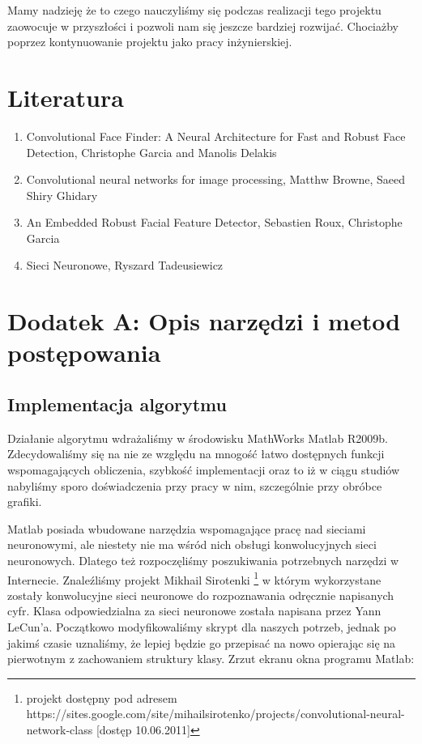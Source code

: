 \documentclass[11pt,a4paper]{article}
\begin{document}
Mamy nadzieję że to czego nauczyliśmy się podczas realizacji tego projektu zaowocuje w przyszłości 
i pozwoli nam się jeszcze bardziej rozwijać. Chociażby poprzez kontynuowanie projektu jako pracy inżynierskiej.

\section{Literatura}
 \begin{enumerate}
\item Convolutional Face Finder: A Neural Architecture for Fast and Robust Face Detection, 
Christophe Garcia and Manolis Delakis
\item Convolutional neural networks for image processing, Matthw Browne, Saeed Shiry Ghidary
\item An Embedded Robust Facial Feature Detector, Sebastien Roux, Christophe Garcia
\item Sieci Neuronowe, Ryszard Tadeusiewicz
 \end{enumerate}
\newpage
\section{Dodatek A: Opis narzędzi i metod postępowania}
\subsection{Implementacja algorytmu}
Działanie algorytmu wdrażaliśmy w środowisku MathWorks Matlab R2009b. Zdecydowaliśmy się na nie ze 
względu na mnogość łatwo dostępnych funkcji wspomagających obliczenia, szybkość implementacji oraz 
to iż w ciągu studiów nabyliśmy sporo doświadczenia przy pracy w nim, szczególnie przy obróbce 
grafiki.

Matlab posiada wbudowane narzędzia wspomagające pracę nad sieciami neuronowymi, ale niestety nie ma 
wśród nich obsługi konwolucyjnych sieci neuronowych. Dlatego też rozpoczęliśmy poszukiwania 
potrzebnych narzędzi w Internecie. Znaleźliśmy projekt Mikhail Sirotenki \footnote{ projekt dostępny
pod adresem  https://sites.google.com/site/mihailsirotenko/projects/convolutional-neural-network-class
[dostęp 10.06.2011]}  w którym wykorzystane zostały konwolucyjne sieci neuronowe do rozpoznawania 
odręcznie napisanych cyfr. Klasa odpowiedzialna za sieci neuronowe została napisana przez 
Yann LeCun'a. Początkowo modyfikowaliśmy skrypt dla naszych potrzeb, jednak po jakimś czasie 
uznaliśmy, że lepiej będzie go przepisać na nowo opierając się na pierwotnym z zachowaniem struktury
klasy. Zrzut ekranu okna programu Matlab:
\end{document}
